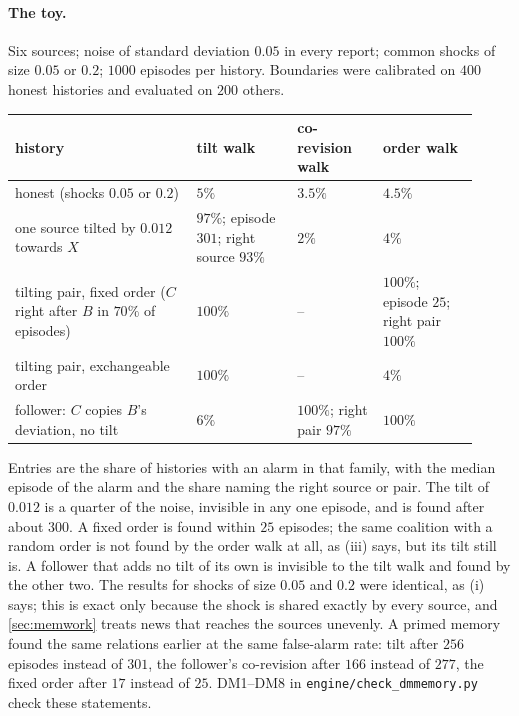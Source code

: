 \documentclass[11pt]{article}
\theoremstyle{definition}\newtheorem{definition}[theorem]{Definition}\newtheorem{remark}[theorem]{Remark}\newtheorem{example}[theorem]{Example}\newtheorem{problem}[theorem]{Open problem}\crefname{problem}{Problem}{Problems}
\begin{document}
\paragraph{The toy.} Six sources; noise of standard deviation $0.05$ in every report; common shocks of size $0.05$ or $0.2$; $1000$ episodes per history. Boundaries were calibrated on $400$ honest histories and evaluated on $200$ others.
\begin{center}\footnotesize
\begin{tabular}{@{}p{0.36\linewidth}p{0.2\linewidth}p{0.17\linewidth}p{0.19\linewidth}@{}}
\toprule
history & tilt walk & co-revision walk & order walk\\\midrule
honest (shocks $0.05$ or $0.2$) & $5\%$ & $3.5\%$ & $4.5\%$\\
one source tilted by $0.012$ towards $X$ & $97\%$; episode $301$; right source $93\%$ & $2\%$ & $4\%$\\
tilting pair, fixed order ($C$ right after $B$ in $70\%$ of episodes) & $100\%$ & -- & $100\%$; episode $25$; right pair $100\%$\\
tilting pair, exchangeable order & $100\%$ & -- & $4\%$\\
follower: $C$ copies $B$'s deviation, no tilt & $6\%$ & $100\%$; right pair $97\%$ & $100\%$\\
\bottomrule
\end{tabular}
\end{center}
Entries are the share of histories with an alarm in that family, with the median episode of the alarm and the share naming the right source or pair. The tilt of $0.012$ is a quarter of the noise, invisible in any one episode, and is found after about $300$. A fixed order is found within $25$ episodes; the same coalition with a random order is not found by the order walk at all, as (iii) says, but its tilt still is. A follower that adds no tilt of its own is invisible to the tilt walk and found by the other two. The results for shocks of size $0.05$ and $0.2$ were identical, as (i) says; this is exact only because the shock is shared exactly by every source, and \cref{sec:memwork} treats news that reaches the sources unevenly. A primed memory found the same relations earlier at the same false-alarm rate: tilt after $256$ episodes instead of $301$, the follower's co-revision after $166$ instead of $277$, the fixed order after $17$ instead of $25$. DM1--DM8 in \texttt{engine/check\_dmmemory.py} check these statements.
\end{document}
